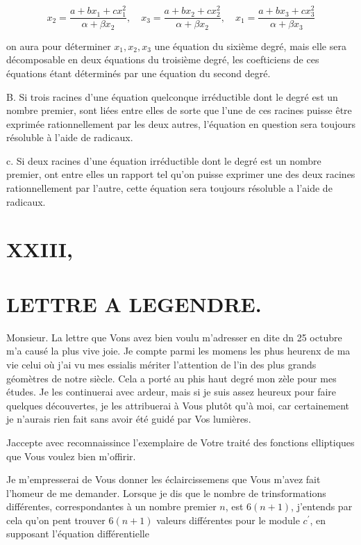 \documentclass{article}
\begin{document}
\[
x_{2}=\frac{a+b x_{1}+c x_{1}^{2}}{\alpha+\beta x_{2}}, \quad x_{3}=\frac{a+b x_{2}+c x_{2}^{2}}{\alpha+\beta x_{2}}, \quad x_{1}=\frac{a+b x_{3}+c x_{3}^{2}}{\alpha+\beta x_{3}}
\]

on aura pour déterminer \(x_{1}, x_{2}, x_{3}\) une équation du sixième degré, mais elle sera décomposable en deux équations du troisième degré, les coefticiens de ces équations étant déterminés par une équation du second degré.

B. Si trois racines d'une équation quelconque irréductible dont le degré est un nombre premier, sont liées entre elles de sorte que l'une de ces racines puisse être exprimée rationnellement par les deux autres, l'équation en question sera toujours résoluble à l'aide de radicaux.

c. Si deux racines d'une équation irréductible dont le degré est un nombre premier, ont entre elles un rapport tel qu'on puisse exprimer une des deux racines rationnellement par l'autre, cette équation sera toujours résoluble a l'aide de radicaux.

\section*{XXIII,}

\section*{LETTRE A LEGENDRE.}

Monsieur. La lettre que Vons avez bien voulu m'adresser en dite dn 25 octubre m'a causé la plus vive joie. Je compte parmi les momens les phus heurenx de ma vie celui où j'ai vu mes essialis mériter l'attention de l'in des plus grands géomètres de notre siècle. Cela a porté au phis haut degré mon zèle pour mes études. Je les continuerai avec ardeur, mais si je suis assez heureux pour faire quelques découvertes, je les attribuerai à Vous plutôt qu'à moi, car certainement je n'aurais rien fait sans avoir été guidé par Vos lumières.

Jaccepte avec recomnaissince l'exemplaire de Votre traité des fonctions elliptiques que Vous voulez bien m'offirir.

Je m'empresserai de Vous donner les éclaircissemens que Vous m'avez fait l'homeur de me demander. Lorsque je dis que le nombre de trinsformations différentes, correspondantes à un nombre premier \(n\), est \(6(n+1)\), j'entends par cela qu'on pent trouver \(6(n+1)\) valeurs différentes pour le module \(c^{\prime}\), en supposant l'équation différentielle
\end{document}
